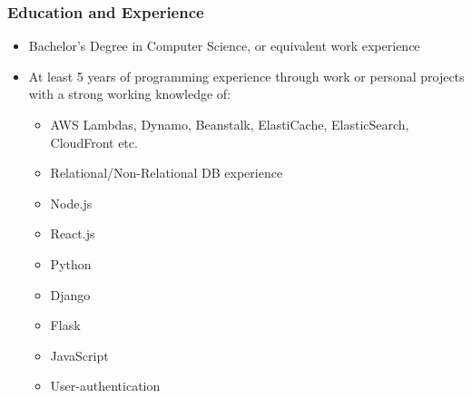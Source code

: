 \subsubsection*{Education and Experience}
\begin{itemize}
    \item Bachelor’s Degree in Computer Science, or equivalent work experience
    \item At least 5 years of programming experience through work or personal projects with a strong working knowledge of:
        \begin{itemize}
        \item AWS Lambdas, Dynamo, Beanstalk, ElastiCache, ElasticSearch, CloudFront etc.
        \item Relational/Non-Relational DB experience
        \item Node.js
        \item React.js
        \item Python
        \item Django
        \item Flask
        \item JavaScript
        \item User-authentication
        \end{itemize}
\end{itemize}
